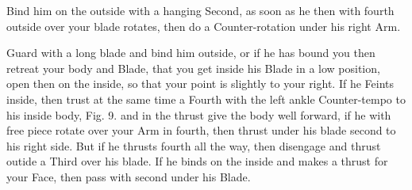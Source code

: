 \exercise{}


Bind him on the outside with a hanging Second, as soon as he then with
fourth outside over your blade rotates, then do a Counter-rotation
under his right Arm.

\exercise{}


Guard with a long blade and bind him outside, or if he has bound you
then retreat your body and Blade, that you get inside his Blade in a
low position, open then on the inside, so that your point is slightly
to your right. If he Feints inside, then trust at the same time a
Fourth with the left ankle Counter-tempo to his inside body,
Fig. 9. and in the thrust give the body well forward, if he with free
piece rotate over your Arm in fourth, then thrust under his blade
second to his right side. But if he thrusts fourth all the way, then
disengage and thrust outide a Third over his blade. If he binds on the
inside and makes a thrust for your Face, then pass with second under
his Blade.
